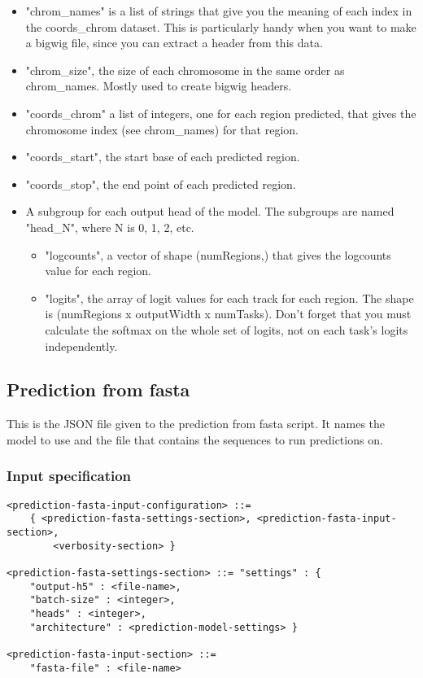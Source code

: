 \documentclass{article}
\begin{document}
\begin{itemize}
    \item "chrom\_names" is a list of strings that give you the meaning of each index in the coords\_chrom dataset. This is particularly handy when you want to make a bigwig file, since you can extract a header from this data. 
    \item "chrom\_size", the size of each chromosome in the same order as chrom\_names. Mostly used to create bigwig headers. 
    \item "coords\_chrom" a list of integers, one for each region predicted, that gives the chromosome index (see chrom\_names) for that region. 
    \item "coords\_start", the start base of each predicted region. 
    \item "coords\_stop", the end point of each predicted region.
    \item A subgroup for each output head of the model. The subgroups are named "head\_N", where N is 0, 1, 2, etc. 
        \begin{itemize}
            \item "logcounts", a vector of shape (numRegions,) that gives the logcounts value for each region. 
            \item "logits", the array of logit values for each track for each region. The shape is (numRegions x outputWidth x numTasks). Don't forget that you must calculate the softmax on the whole set of logits, not on each task's logits independently.
        \end{itemize} 

\end{itemize}

\subsection{Prediction from fasta}

This is the JSON file given to the prediction from fasta script. It names the model to use and the file that contains the sequences to run predictions on.

\subsubsection{Input specification}

\begin{lstlisting}
<prediction-fasta-input-configuration> ::=
    { <prediction-fasta-settings-section>, <prediction-fasta-input-section>,
        <verbosity-section> }

<prediction-fasta-settings-section> ::= "settings" : {
    "output-h5" : <file-name>,
    "batch-size" : <integer>,
    "heads" : <integer>,
    "architecture" : <prediction-model-settings> }

<prediction-fasta-input-section> ::=
    "fasta-file" : <file-name>
\end{lstlisting}
\end{document}
